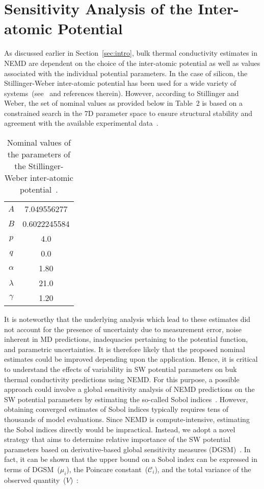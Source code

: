 \section{Sensitivity Analysis of the Inter-atomic Potential}
\label{sec:sense}

As discussed earlier in Section~\ref{sec:intro}, bulk thermal conductivity estimates in NEMD
are dependent on the choice of the inter-atomic potential as well as values associated with
the individual potential parameters. In the case of silicon, the Stillinger-Weber inter-atomic potential
has been used for a wide variety of 
systems~(see~\cite{Laradji:1995,Zhang:2014,Jiang:2015,Watanabe:1999,Zhou:2013} and references therein).
However, according to Stillinger and Weber, the set of nominal
values as provided below in Table~2 is based on a constrained search in the 7D parameter space
to ensure structural stability and agreement with the available experimental data~\cite{Stillinger:1985}.

\begin{table}[htbp]
\begin{center}
\begin{tabular}{|c||c|}
\hline
$A$ & 7.049556277 \\
$B$ & 0.6022245584 \\
$p$ & 4.0 \\
$q$ & 0.0 \\
$\alpha$ & 1.80 \\
$\lambda$ & 21.0 \\
$\gamma$ & 1.20 \\
\hline
\end{tabular}
\end{center}
\caption{Nominal values of the parameters of the Stillinger-Weber inter-atomic
potential~\cite{Stillinger:1985}.}
\end{table}

It is noteworthy that the underlying analysis which lead to these estimates did not account for the
presence of uncertainty due to
measurement error, noise inherent in MD predictions, inadequacies pertaining to the potential function,
and parametric uncertainties. It is therefore likely that the proposed nominal estimates could be 
improved depending upon the application. Hence, it is critical to understand the effects of variability in
SW potential parameters on buk thermal conductivity predictions using NEMD. For this purpose, a possible
approach could involve a global sensitivity analysis of NEMD predictions on the SW potential parameters 
by estimating the so-called Sobol indices~\cite{Sobol:2001}. However, obtaining converged estimates of
Sobol indices typically requires tens of thousands of model evaluations. Since NEMD is compute-intensive,
estimating the Sobol indices directly would be impractical. Instead, we adopt a novel strategy that
aims to determine relative importance of the SW potential parameters based on derivative-based global 
sensitivity measures (DGSM)~\cite{Sobol:2010}. In fact, it can be shown that the upper bound on a 
Sobol index can be expressed in terms of DGSM~($\mu_i$), the Poincare constant~($\mathcal{C}_i$), and the
total variance of the observed quantity~($V$)~\cite{Lamboni:2013,Roustant:2014}:    


